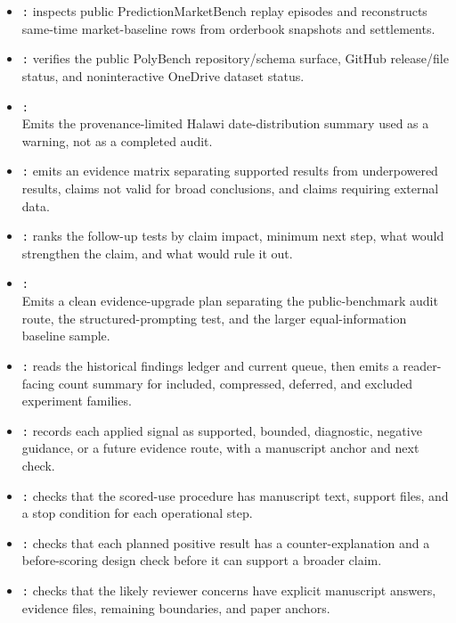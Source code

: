 \documentclass[11pt]{article}
\begin{document}
\begin{itemize}[leftmargin=*]
\item \texttt{:} inspects public PredictionMarketBench replay episodes and reconstructs same-time market-baseline rows from orderbook snapshots and settlements.
\item \texttt{:} verifies the public PolyBench repository/schema surface, GitHub release/file status, and noninteractive OneDrive dataset status.
\item \texttt{:}\\
Emits the provenance-limited Halawi date-distribution summary used as a warning, not as a completed audit.
\item \texttt{:} emits an evidence matrix separating supported results from underpowered results, claims not valid for broad conclusions, and claims requiring external data.
\item \texttt{:} ranks the follow-up tests by claim impact, minimum next step, what would strengthen the claim, and what would rule it out.
\item \texttt{:}\\
Emits a clean evidence-upgrade plan separating the public-benchmark audit route, the structured-prompting test, and the larger equal-information baseline sample.
\item \texttt{:} reads the historical findings ledger and current queue, then emits a reader-facing count summary for included, compressed, deferred, and excluded experiment families.
\item \texttt{:} records each applied signal as supported, bounded, diagnostic, negative guidance, or a future evidence route, with a manuscript anchor and next check.
\item \texttt{:} checks that the scored-use procedure has manuscript text, support files, and a stop condition for each operational step.
\item \texttt{:} checks that each planned positive result has a counter-explanation and a before-scoring design check before it can support a broader claim.
\item \texttt{:} checks that the likely reviewer concerns have explicit manuscript answers, evidence files, remaining boundaries, and paper anchors.

\end{itemize}
\end{document}
